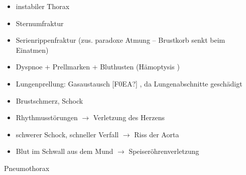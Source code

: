 \documentclass{article}
\begin{document}
\begin{itemize}
\item instabiler Thorax

\end{itemize}
\begin{itemize}
\item Sternumfraktur

\item Serienrippenfraktur (zus. paradoxe Atmung --  Brustkorb senkt beim
Einatmen)

\end{itemize}
\begin{itemize}
\item Dyspnoe + Prellmarken +  Bluthusten  (H\"amoptysis )

\end{itemize}
\begin{itemize}
\item Lungenprellung: Gasaustausch [F0EA?] , da  Lungenabschnitte
gesch\"adigt

\end{itemize}
\begin{itemize}
\item Brustschmerz, Schock 

\end{itemize}
\begin{itemize}
\item Rhythmusst\"orungen ${\rightarrow}$ Verletzung des  Herzens

\item schwerer Schock, schneller Verfall ${\rightarrow}$ Riss der  Aorta

\item Blut im Schwall aus dem Mund ${\rightarrow}$ 
Speiser\"ohrenverletzung

\end{itemize}
Pneumothorax
\end{document}
